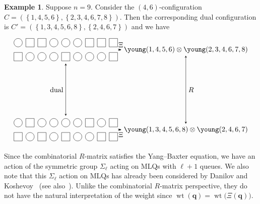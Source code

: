 \documentclass[reqno]{amsart}
\newcommand{\0}{\phantom{c}}
\newcommand{\SymGp}[1]{\Sigma_{#1}} %
\DeclareMathOperator{\wt}{wt} %
\newcommand{\qq}{\mathbf{q}}
\newcommand{\set}[1]{\left\{ #1 \right\}}
\theoremstyle{plain}
\theoremstyle{definition}
\newtheorem{example}[thm]{Example}
\numberwithin{equation}{section}
\begin{document}
\begin{example}
Suppose $n = 9$.
Consider the $(4,6)$-configuration $C = (\set{1,4,5,6}, \set{2,3,4,6,7,8})$.
Then the corresponding dual configuration is $C' = (\set{1,3,4,5,6,8}, \set{2,4,6,7})$ and we have
\[
\begin{tikzpicture}[xscale=6,yscale=4,>=stealth]
\node (C) at (0,0) { %
\begin{tikzpicture}[scale=0.7]
  \def\sc{0.85}   %
  \def\ll{2}   %
  \def\l{1}   %
  \foreach \i in {1,4,5,6} { \draw[fill=white] (\i*\sc,\ll) circle (0.3); }
  \foreach \i in {2,3,7,8,9} { \draw[fill=white] (\i*\sc-.3,\ll-.3) rectangle +(0.6,+0.6); }
  \foreach \i in {2,3,4,6,7,8} { \draw[fill=white] (\i*\sc,\l) circle (0.3); }
  \foreach \i in {1,5,9} { \draw[fill=white] (\i*\sc-.3,\l-.3) rectangle +(0.6,+0.6); }
\end{tikzpicture}
};
\node (Cp) at (0,-1) { %
\begin{tikzpicture}[scale=0.7]
  \def\sc{0.85}   %
  \def\ll{2}   %
  \def\l{1}   %
  \foreach \i in {1,3,4,5,6,8} { \draw[fill=white] (\i*\sc,\ll) circle (0.3); }
  \foreach \i in {2,7,9} { \draw[fill=white] (\i*\sc-.3,\ll-.3) rectangle +(0.6,+0.6); }
  \foreach \i in {2,4,6,7} { \draw[fill=white] (\i*\sc,\l) circle (0.3); }
  \foreach \i in {1,3,5,8,9} { \draw[fill=white] (\i*\sc-.3,\l-.3) rectangle +(0.6,+0.6); }
\end{tikzpicture}
};
\node (KR) at (1,0) {$\young(1,4,5,6) \otimes \young(2,3,4,6,7,8)$};
\node (KRp) at (1,-1) {$\young(1,3,4,5,6,8) \otimes \young(2,4,6,7)$};
\draw[<->] (C) -- (Cp) node[midway,anchor=east] {dual};
\draw[<->] (C) -- (KR) node[midway,anchor=south] {$\Xi$};
\draw[<->] (KR) -- (KRp) node[midway,anchor=west] {$R$};
\draw[<->] (Cp) -- (KRp) node[midway,anchor=north] {$\Xi$};
\end{tikzpicture}
\]
\end{example}

Since the combinatorial $R$-matrix satisfies the Yang--Baxter equation, we have an action of the symmetric group $\SymGp{\ell}$ acting on MLQs with $\ell + 1$ queues.
We also note that this $\SymGp{\ell}$ action on MLQs has already been considered by Danilov and Koshevoy~\cite{DanilovKoshevoy} (see also~\cite[Ch.~4]{Gorodentsev2}).
Unlike the combinatorial $R$-matrix perspective, they do not have the natural interpretation of the weight since $\wt(\qq) = \wt\bigl( \Xi(\qq) \bigr)$.
\end{document}

